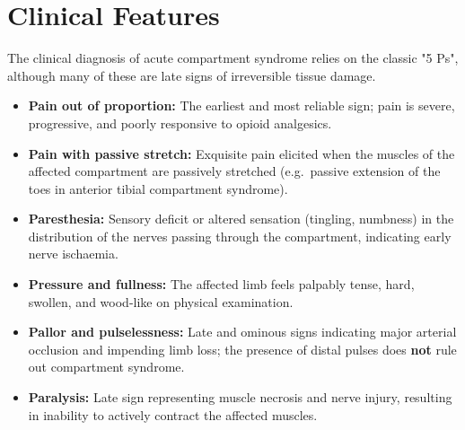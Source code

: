 \section*{Clinical Features}
The clinical diagnosis of acute compartment syndrome relies on the classic "5 Ps", although many of these are late signs of irreversible tissue damage.
\begin{itemize}
    \item \textbf{Pain out of proportion:} The earliest and most reliable sign; pain is severe, progressive, and poorly responsive to opioid analgesics.
    \item \textbf{Pain with passive stretch:} Exquisite pain elicited when the muscles of the affected compartment are passively stretched (e.g.\ passive extension of the toes in anterior tibial compartment syndrome).
    \item \textbf{Paresthesia:} Sensory deficit or altered sensation (tingling, numbness) in the distribution of the nerves passing through the compartment, indicating early nerve ischaemia.
    \item \textbf{Pressure and fullness:} The affected limb feels palpably tense, hard, swollen, and wood-like on physical examination.
    \item \textbf{Pallor and pulselessness:} Late and ominous signs indicating major arterial occlusion and impending limb loss; the presence of distal pulses does \textbf{not} rule out compartment syndrome.
    \item \textbf{Paralysis:} Late sign representing muscle necrosis and nerve injury, resulting in inability to actively contract the affected muscles.
\end{itemize}


